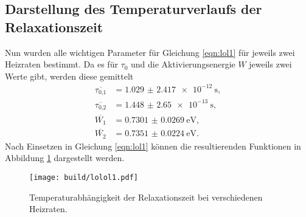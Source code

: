 \subsection{Darstellung des Temperaturverlaufs der Relaxationszeit}
Nun wurden alle wichtigen Parameter für Gleichung \eqref{eqn:lol1} für jeweils zwei Heizraten bestimmt.
Da es für $\tau_0$ und die Aktivierungsenergie $W$ jeweils zwei Werte gibt, werden diese gemittelt
\begin{align}
    \overline{\tau_{0\text{,}1}} &= \SI{1.029(2417)e-12}{\second},\\
    \overline{\tau_{0\text{,}2}} &= \SI{1.448(2650)e-13}{\second}, \\
    \overline{W_{1}} &= \SI{0.7301(269)}{\electronvolt}, \\
    \overline{W_{2}} &= \SI{0.7351(224)}{\electronvolt}. 
\end{align}
Nach Einsetzen in Gleichung \eqref{eqn:lol1} können die resultierenden Funktionen in Abbildung \ref{fig:whatthefuck} dargestellt werden.
\begin{figure}
    \centering
    \texttt{[image: build/lolol1.pdf]}
    \caption{Temperaturabhängigkeit der Relaxationszeit bei verschiedenen Heizraten.
            }
    \label{fig:whatthefuck}
\end{figure}